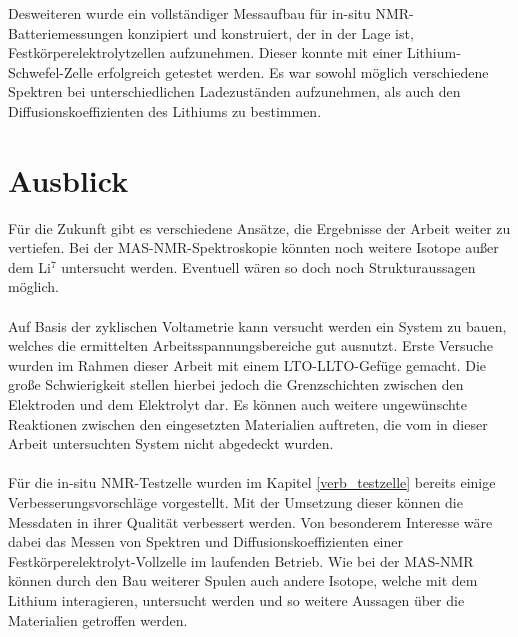 \documentclass[a4paper, 11pt, headsepline,footsepline,twoside,abstract]{scrbook}
\begin{document}
Desweiteren wurde ein vollständiger Messaufbau für in-situ NMR-Batterie\-messungen konzipiert und konstruiert, der in der Lage ist, Festkörperelektrolytzellen aufzunehmen. Dieser konnte mit einer Lithium-Schwefel-Zelle erfolgreich getestet werden. Es war sowohl möglich verschiedene Spektren bei unterschiedlichen Ladezuständen aufzunehmen, als auch den Diffusionskoeffizienten des Lithiums zu bestimmen.
\section{Ausblick}
Für die Zukunft gibt es verschiedene Ansätze, die Ergebnisse der Arbeit weiter zu vertiefen. Bei der MAS-NMR-Spektroskopie könnten noch weitere Isotope außer dem Li$^7$ untersucht werden. Eventuell wären so doch noch Strukturaussagen möglich.
\\\\
Auf Basis der zyklischen Voltametrie kann versucht werden ein System zu bauen, welches die ermittelten Arbeitsspannungsbereiche gut ausnutzt. Erste Versuche wurden im Rahmen dieser Arbeit mit einem LTO-LLTO-Gefüge gemacht. Die große Schwierigkeit stellen hierbei jedoch die Grenzschichten zwischen den Elektroden und dem Elektrolyt dar. Es können auch weitere ungewünschte Reaktionen zwischen den eingesetzten Materialien auftreten, die vom in dieser Arbeit untersuchten System nicht abgedeckt wurden.
\\\\
Für die in-situ NMR-Testzelle wurden im Kapitel \ref{verb_testzelle} bereits einige Verbesserungsvorschläge vorgestellt. Mit der Umsetzung dieser können die Messdaten in ihrer Qualität verbessert werden. Von besonderem Interesse wäre dabei das Messen von Spektren und Diffusionskoeffizienten einer Festkörperelektrolyt-Vollzelle im laufenden Betrieb. Wie bei der MAS-NMR können durch den Bau weiterer Spulen auch andere Isotope, welche mit dem Lithium interagieren, untersucht werden und so weitere Aussagen über die Materialien getroffen werden.
\renewcommand{\thesection}{\Alph{section}}
\end{document}
